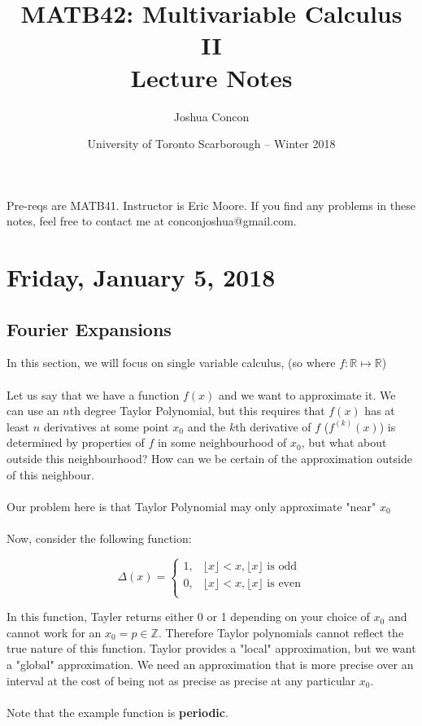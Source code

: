 \documentclass[12pt]{article}
\theoremstyle{plain}
\theoremstyle{definition}
\begin{document}
\title{MATB42: Multivariable Calculus II\\ Lecture Notes}
\date{University of Toronto Scarborough -- Winter 2018}
\author{Joshua Concon}
\maketitle
Pre-reqs are MATB41. Instructor is Eric Moore. If you find any problems in these notes, feel free to contact me at conconjoshua@gmail.com.

\tableofcontents

\pagebreak

\section{Friday, January 5, 2018}

\subsection{Fourier Expansions}

In this section, we will focus on single variable calculus, (so where $f:\mathbb{R} \mapsto \mathbb{R}$)\\
\\
Let us say that we have a function $f(x)$ and we want to approximate it. We can use an $n$th degree Taylor Polynomial, but this requires that $f(x)$ has at least $n$ derivatives at some point $x_0$ and the $k$th derivative of $f$ ($f^{(k)} (x)$) is determined by properties of $f$ in some neighbourhood of $x_0$, but what about outside this neighbourhood? How can we be certain of the approximation outside of this neighbour.\\
\\
Our problem here is that Taylor Polynomial may only approximate "near" $x_0$\\
\\
Now, consider the following function:

$$\Delta (x) = \begin{cases}
1, &\lfloor x \rfloor < x, \lfloor x \rfloor\text{ is odd} \\
0, &\lfloor x \rfloor < x, \lfloor x \rfloor\text{ is even}\\
\end{cases}
$$

In this function, Tayler returns either 0 or 1 depending on your choice of $x_0$ and cannot work for an $x_0 = p \in \mathbb{Z}$. Therefore Taylor polynomials cannot reflect the true nature of this function. Taylor provides a "local" approximation, but we want a "global" approximation. We need an approximation that is more precise over an interval at the cost of being not as precise as precise at any particular $x_0$.\\
\\
Note that the example function is \textbf{periodic}.\\
\\
\end{document}
